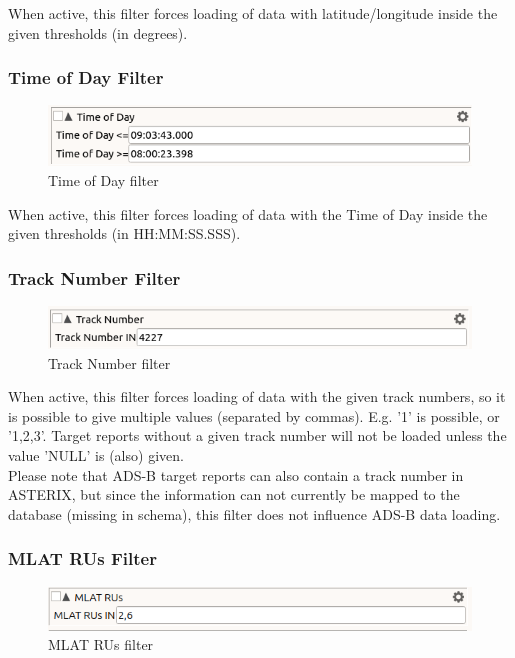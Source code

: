 When active, this filter forces loading of data with latitude/longitude inside the given thresholds (in degrees).

\subsubsection{Time of Day Filter}

\begin{figure}[H]
  \center
    \includegraphics[width=12cm,frame]{figures/filter_tod.png}
  \caption{Time of Day filter}
\end{figure}

When active, this filter forces loading of data with the Time of Day inside the given thresholds (in HH:MM:SS.SSS).

\subsubsection{Track Number Filter}

\begin{figure}[H]
  \center
    \includegraphics[width=12cm,frame]{figures/filter_tracknum.png}
  \caption{Track Number filter}
\end{figure}

When active, this filter forces loading of data with the given track numbers, so it is possible to give multiple values (separated by commas). E.g. '1' is possible, or '1,2,3'. Target reports without a given track number will not be loaded unless the value 'NULL' is (also) given. \\

Please note that ADS-B target reports can also contain a track number in ASTERIX, but since the information can not currently be mapped to the database (missing in schema), this filter does not influence ADS-B data loading.

\subsubsection{MLAT RUs Filter}

\begin{figure}[H]
  \center
    \includegraphics[width=12cm,frame]{figures/filter_mlatrus.png}
  \caption{MLAT RUs filter}
\end{figure}

